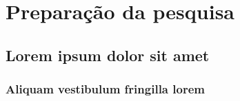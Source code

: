 
\part{Preparação da pesquisa}


\chapter{Lorem ipsum dolor sit amet}

\section{Aliquam vestibulum fringilla lorem}
